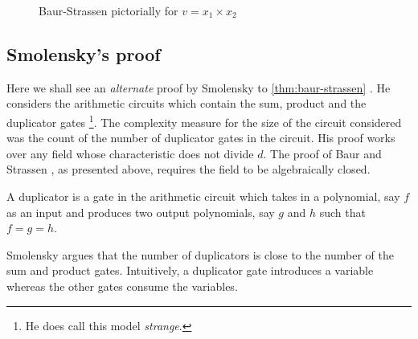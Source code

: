 \begin{figure}[h]
\begin{center}
\end{center}
\caption{Baur-Strassen pictorially for $v = x_1 \times x_2$}
\label{fig:baur-strassen}
\end{figure}

\subsection{Smolensky's proof}
Here we shall see an \emph{alternate} proof by Smolensky to \autoref{thm:baur-strassen} \cite{smolensky97}. He considers the arithmetic circuits which contain the sum, product and the duplicator gates \footnote{He does call this model \emph{strange}.}. The complexity measure for the size of the circuit considered was the count of the number of duplicator gates in the circuit. His proof works over any field whose characteristic does not divide $d$. The proof of Baur and Strassen \cite{BS83}, as presented above, requires the field to be algebraically closed. 

\begin{definition}\label{def:duplicator}
  A duplicator is a gate in the arithmetic circuit which takes in a polynomial, say $f$ as an input and produces two output polynomials, say $g$ and $h$ such that $f = g = h$.
\end{definition}

Smolensky argues that the number of duplicators is close to the number of the sum and product gates. Intuitively, a duplicator gate introduces a variable whereas the other gates consume the variables. 

